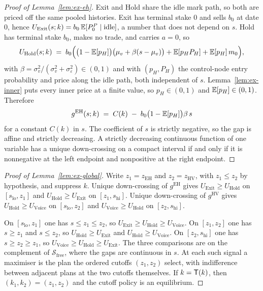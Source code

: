 \begin{proof}[Proof of Lemma~\ref{lem:ex-eh}]
Exit and Hold share the idle mark path, so both are priced off the same pooled histories. Exit has
terminal stake $0$ and sells $b_0$ at date $0$, hence
$U_{\mathrm{Exit}}(s;k)=b_0\,\mathbb{E}[P_0^P\mid \text{idle}]$, a number that does not depend on $s$.
Hold has terminal stake $b_0$, makes no trade, and carries $a=0$, so
\[
U_{\mathrm{Hold}}(s;k)
 \;=\; b_0\Bigl(
   \bigl(1-\mathbb{E}[p_H]\bigr)\bigl(\mu_v+\beta(s-\mu_v)\bigr)
   +\mathbb{E}[p_H P_H]
   +\mathbb{E}[p_H]\,m_0
 \Bigr),
\]
with $\beta=\sigma_v^2/(\sigma_v^2+\sigma_\varepsilon^2)\in(0,1)$ and with $(p_H,P_H)$ the
control-node entry probability and price along the idle path, both independent of $s$. Lemma~\ref{lem:ex-inner}
puts every inner price at a finite value, so $p_H\in(0,1)$ and $\mathbb{E}[p_H]\in(0,1)$. Therefore
\[
g^{\mathrm{EH}}(s;k)
 \;=\; C(k) \;-\; b_0\bigl(1-\mathbb{E}[p_H]\bigr)\beta\, s
\]
for a constant $C(k)$ in $s$. The coefficient of $s$ is strictly negative, so the gap is affine and
strictly decreasing. A strictly decreasing continuous function of one variable has a unique
down-crossing on a compact interval if and only if it is nonnegative at the left endpoint and
nonpositive at the right endpoint.
\end{proof}

\begin{proof}[Proof of Lemma~\ref{lem:ex-global}]
Write $z_1=z_{\mathrm{EH}}$ and $z_2=z_{\mathrm{HV}}$, with $z_1\le z_2$ by hypothesis, and suppress
$k$. Unique down-crossing of $g^{\mathrm{EH}}$ gives $U_{\mathrm{Exit}}\ge U_{\mathrm{Hold}}$ on
$[s_{\mathrm{lo}},z_1]$ and $U_{\mathrm{Hold}}\ge U_{\mathrm{Exit}}$ on $[z_1,s_{\mathrm{hi}}]$.
Unique down-crossing of $g^{\mathrm{HV}}$ gives $U_{\mathrm{Hold}}\ge U_{\mathrm{Voice}}$ on
$[s_{\mathrm{lo}},z_2]$ and $U_{\mathrm{Voice}}\ge U_{\mathrm{Hold}}$ on $[z_2,s_{\mathrm{hi}}]$.

On $[s_{\mathrm{lo}},z_1]$ one has $s\le z_1\le z_2$, so $U_{\mathrm{Exit}}\ge U_{\mathrm{Hold}}\ge
U_{\mathrm{Voice}}$. On $[z_1,z_2]$ one has $s\ge z_1$ and $s\le z_2$, so
$U_{\mathrm{Hold}}\ge U_{\mathrm{Exit}}$ and $U_{\mathrm{Hold}}\ge U_{\mathrm{Voice}}$. On
$[z_2,s_{\mathrm{hi}}]$ one has $s\ge z_2\ge z_1$, so $U_{\mathrm{Voice}}\ge U_{\mathrm{Hold}}\ge
U_{\mathrm{Exit}}$. The three comparisons are on the complement of $\mathcal S_{\mathrm{free}}$,
where the gaps are continuous in $s$. At each such signal a maximiser is the plan the ordered
cutoffs $(z_1,z_2)$ select, with indifference between adjacent plans at the two cutoffs themselves.
If $k=\mathsf{T}(k)$, then $(k_1,k_2)=(z_1,z_2)$ and the cutoff policy is an equilibrium.
\end{proof}


